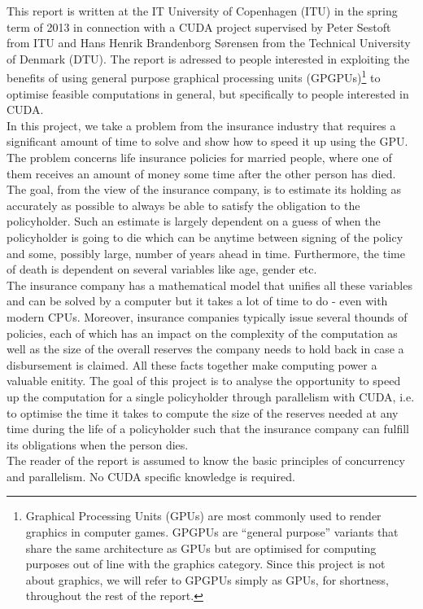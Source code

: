 This report is written at the IT University of Copenhagen (ITU) in the spring term of 2013 in connection with a CUDA project supervised by Peter Sestoft from ITU and Hans Henrik Brandenborg Sørensen from the Technical University of Denmark (DTU). The report is adressed to people interested in exploiting the benefits of using general purpose graphical processing units (GPGPUs)\footnote{Graphical Processing Units (GPUs) are most commonly used to render graphics in computer games. GPGPUs are ``general purpose'' variants that share the same architecture as GPUs but are optimised for computing purposes out of line with the graphics category. Since this project is not about graphics, we will refer to GPGPUs simply as GPUs, for shortness, throughout the rest of the report.} to optimise feasible computations in general, but specifically to people interested in CUDA.\\

In this project, we take a problem from the insurance industry that requires a significant amount of time to solve and show how to speed it up using the GPU. The problem concerns life insurance policies for married people, where one of them receives an amount of money some time after the other person has died. The goal, from the view of the insurance company, is to estimate its holding as accurately as possible to always be able to satisfy the obligation to the policyholder. Such an estimate is largely dependent on a guess of when the policyholder is going to die which can be anytime between signing of the policy and some, possibly large, number of years ahead in time. Furthermore, the time of death is dependent on several variables like age, gender etc. \\

The insurance company has a mathematical model that unifies all these variables and can be solved by a computer but it takes a lot of time to do - even with modern CPUs. Moreover, insurance companies typically issue several thounds of policies, each of which has an impact on the complexity of the computation as well as the size of the overall reserves the company needs to hold back in case a disbursement is claimed. All these facts together make computing power a valuable enitity. The goal of this project is to analyse the opportunity to speed up the computation for a single policyholder through parallelism with CUDA, i.e. to optimise the time it takes to compute the size of the reserves needed at any time during the life of a policyholder such that the insurance company can fulfill its obligations when the person dies.\\

The reader of the report is assumed to know the basic principles of concurrency and parallelism. No CUDA specific knowledge is required.